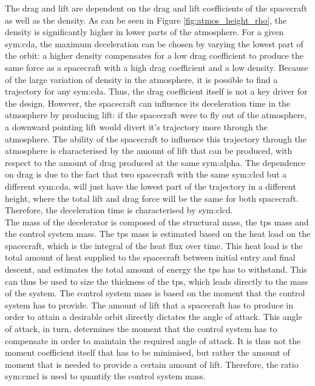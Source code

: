 The drag and lift are dependent on the drag and lift coefficients of the spacecraft as well as the density. As can be seen in Figure \ref{fig:atmos_height_rho}, the density is significantly higher in lower parts of the atmosphere. For a given \gls{sym:cda}, the maximum deceleration can be chosen by varying the lowest part of the orbit: a higher density compensates for a low drag coefficient to produce the same force as a spacecraft with a high drag coefficient and a low density. Because of the large variation of density in the atmosphere, it is possible to find a trajectory for any \gls{sym:cda}. Thus, the drag coefficient itself is not a key driver for the design. However, the spacecraft can influence its deceleration time in the atmosphere by producing lift: if the spacecraft were to fly out of the atmosphere, a downward pointing lift would divert it's trajectory more through the atmosphere. The ability of the spacecraft to influence this trajectory through the atmosphere is characterised by the amount of lift that can be produced, with respect to the amount of drag produced at the same \gls{sym:alpha}. The dependence on drag is due to the fact that two spacecraft with the same \gls{sym:clcd} but a different \gls{sym:cda}, will just have the lowest part of the trajectory in a different height, where the total lift and drag force will be the same for both spacecraft. Therefore, the deceleration time is characterised by \gls{sym:clcd}. \\

The mass of the decelerator is composed of the structural mass, the \gls{tps} mass and the control system mass. 
The \gls{tps} mass is estimated based on the heat load on the spacecraft, which is the integral of the heat flux over time. This heat load is the total amount of heat supplied to the spacecraft between initial entry and final descent, and estimates the total amount of energy the \gls{tps} has to withstand. This can thus be used to size the thickness of the \gls{tps}, which leads directly to the mass of the system.
The control system mass is based on the moment that the control system has to provide. The amount of lift that a spacecraft has to produce in order to attain a desirable orbit directly dictates the angle of attack. This angle of attack, in turn, determines the moment that the control system has to compensate in order to maintain the required angle of attack. It is thus not the moment coefficient itself that has to be minimised, but rather the amount of moment that is needed to provide a certain amount of lift. Therefore, the ratio \gls{sym:cmcl} is used to quantify the control system mass.

